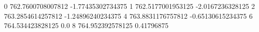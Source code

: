 0 762.7600708007812 -1.77435302734375
1 762.5177001953125 -2.0167236328125
2 763.2854614257812 -1.24896240234375
4 763.8831176757812 -0.65130615234375
6 764.534423828125 0.0
8 764.952392578125 0.41796875
